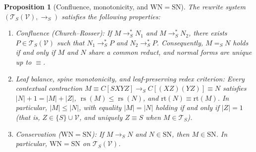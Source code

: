 \documentclass[11pt,reqno]{amsart}
\numberwithin{equation}{section}
\theoremstyle{plain}
\newtheorem{proposition}[theorem]{Proposition}
\theoremstyle{definition}
\theoremstyle{remark}
\DeclareMathOperator{\rs}{rs}
\newcommand{\TS}{\mathcal{T}_S}
\newcommand{\TSV}{\mathcal{T}_S(\mathcal{V})}
\newcommand{\SN}{\mathrm{SN}}
\newcommand{\WN}{\mathrm{WN}}
\newcommand{\redS}{\to_S}
\newcommand{\redSs}{\to_S^*}
\newcommand{\convS}{=_S}
\begin{document}
\begin{proposition}[Confluence, monotonicity, and $\WN = \SN$]\label{prop:cr-conservation}
The rewrite system $(\TSV, \redS)$ satisfies the following properties:
\begin{enumerate}[label=(\roman*),leftmargin=2.2em]
  \item \emph{Confluence (Church--Rosser):} If $M \redSs N_1$ and $M \redSs N_2$, there exists $P \in \TSV$ such that $N_1 \redSs P$ and $N_2 \redSs P$. Consequently, $M \convS N$ holds if and only if $M$ and $N$ share a common reduct, and normal forms are unique up to $\equiv$.
  \item \emph{Leaf balance, spine monotonicity, and leaf-preserving redex criterion:} Every contextual contraction $M \equiv C[S X Y Z] \redS C[(X Z)(Y Z)] \equiv N$ satisfies $|N| + 1 = |M| + |Z|$, $\rs(M) \le \rs(N)$, and $\mathrm{rt}(N) \equiv \mathrm{rt}(M)$. In particular, $|M| \le |N|$, with equality $|M| = |N|$ holding if and only if $|Z| = 1$ (that is, $Z \in \{S\} \cup \mathcal{V}$, and uniquely $Z \equiv S$ when $M \in \TS$).
  \item \emph{Conservation ($\WN = \SN$):} If $M \redS N$ and $N \in \SN$, then $M \in \SN$. In particular, $\WN = \SN$ on $\TSV$.
\end{enumerate}
\end{proposition}
\end{document}
